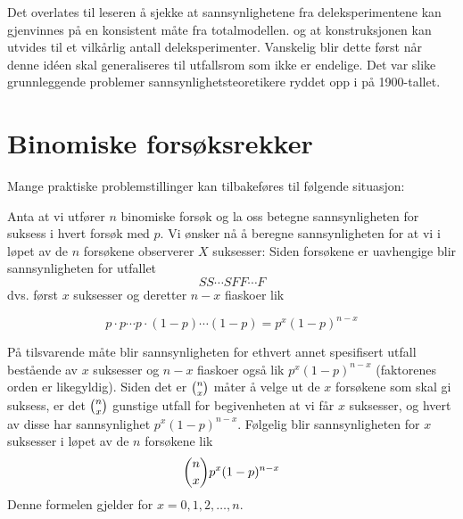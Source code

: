 Det overlates til leseren å sjekke at sannsynlighetene fra 
deleksperimentene kan gjenvinnes på en konsistent måte fra
totalmodellen. og at konstruksjonen kan utvides til et vilkårlig
antall deleksperimenter. Vanskelig blir dette først når denne
id\'{e}en skal generaliseres til utfallsrom som ikke er endelige.
Det var slike grunnleggende problemer sann\-syn\-lig\-hets\-teo\-re\-tikere
ryddet opp i på 1900-tallet.

\normalsize

\section{Binomiske forsøksrekker}

Mange praktiske problemstillinger kan tilbakeføres til følgende
situasjon:
\begin{center}  \end{center}
Anta at vi utfører $n$ binomiske forsøk og la oss betegne
sannsynligheten for suksess i hvert forsøk med $p$. Vi ønsker nå
å beregne sannsynligheten for at vi i løpet av de $n$ forsøkene
observerer $X$ suksesser:
Siden forsøkene er uavhengige blir sannsynligheten for utfallet
\[  SS\cdots SFF \cdots F \]
\noindent dvs. først $x$ suksesser og deretter $n-x$ fiaskoer lik

\[ p\cdot p\cdots p\cdot (1-p)\cdots (1-p)=p^x(1-p)^{n-x} \]

\noindent På tilsvarende måte blir sannsynligheten for ethvert annet
spesifisert utfall bestående av $x$ suksesser og $n-x$ fiaskoer
også lik $p^x(1-p)^{n-x}$ (faktorenes orden er likegyldig). Siden
det er ${{n}\choose{x}}$ måter å velge ut de $x$ forsøkene som skal gi
suksess, er det ${{n}\choose{x}}$ gunstige utfall for begivenheten at vi
får $x$ suksesser, og hvert av disse  har sannsynlighet $p^x(1-
p)^{n-x}$. Følgelig blir sannsynligheten for $x$ suksesser i
løpet av de $n$ forsøkene lik
\[ {{n}\choose{x}}p^x(1-p)^{n-x} \]
\noindent Denne formelen gjelder for $x=0,1,2,\ldots,n$.\\

